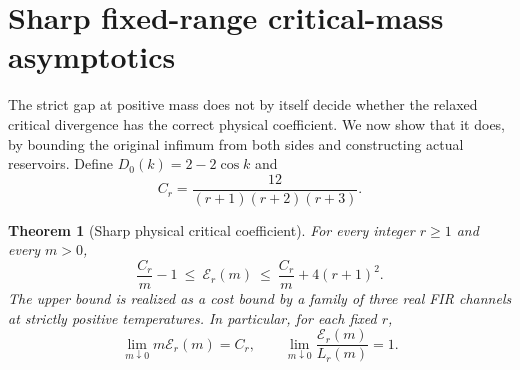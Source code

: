 \documentclass[11pt]{article}
\newtheorem{theorem}{Theorem}
\begin{document}
\section{Sharp fixed-range critical-mass asymptotics}\label{criticalmass}
The strict gap at positive mass does not by itself decide whether the relaxed critical divergence has the correct physical coefficient. We now show that it does, by bounding the original infimum from both sides and constructing actual reservoirs. Define $D_0(k)=2-2\cos k$ and
\[
C_r=\frac{12}{(r+1)(r+2)(r+3)}.
\]
\begin{theorem}[Sharp physical critical coefficient]\label{criticalthm}
For every integer $r\ge1$ and every $m>0$,
\begin{equation}\label{criticalbounds}
\frac{C_r}{m}-1\ \le\ \mathcal E_r(m)\ \le\ \frac{C_r}{m}+4(r+1)^2.
\end{equation}
The upper bound is realized as a cost bound by a family of three real FIR channels at strictly positive temperatures. In particular, for each fixed $r$,
\begin{equation}\label{criticallimit}
\lim_{m\downarrow0}m\mathcal E_r(m)=C_r,
\qquad \lim_{m\downarrow0}\frac{\mathcal E_r(m)}{L_r(m)}=1.
\end{equation}
\end{theorem}
\end{document}

